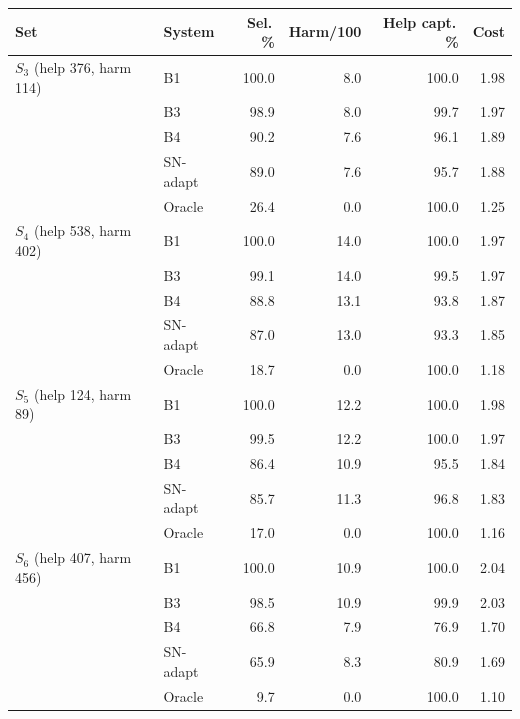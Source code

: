 \begin{tabular}{@{}llrrrr@{}}\toprule
Set & System & Sel.\,\% & Harm/100 & Help capt.\,\% & Cost\\\midrule
$S_3$ \scriptsize(help 376, harm 114) & B1 & 100.0 & 8.0 & 100.0 & 1.98\\
 & B3 & 98.9 & 8.0 & 99.7 & 1.97\\
 & B4 & 90.2 & 7.6 & 96.1 & 1.89\\
 & SN-adapt & 89.0 & 7.6 & 95.7 & 1.88\\
 & Oracle & 26.4 & 0.0 & 100.0 & 1.25\\
\midrule
$S_4$ \scriptsize(help 538, harm 402) & B1 & 100.0 & 14.0 & 100.0 & 1.97\\
 & B3 & 99.1 & 14.0 & 99.5 & 1.97\\
 & B4 & 88.8 & 13.1 & 93.8 & 1.87\\
 & SN-adapt & 87.0 & 13.0 & 93.3 & 1.85\\
 & Oracle & 18.7 & 0.0 & 100.0 & 1.18\\
\midrule
$S_5$ \scriptsize(help 124, harm 89) & B1 & 100.0 & 12.2 & 100.0 & 1.98\\
 & B3 & 99.5 & 12.2 & 100.0 & 1.97\\
 & B4 & 86.4 & 10.9 & 95.5 & 1.84\\
 & SN-adapt & 85.7 & 11.3 & 96.8 & 1.83\\
 & Oracle & 17.0 & 0.0 & 100.0 & 1.16\\
\midrule
$S_6$ \scriptsize(help 407, harm 456) & B1 & 100.0 & 10.9 & 100.0 & 2.04\\
 & B3 & 98.5 & 10.9 & 99.9 & 2.03\\
 & B4 & 66.8 & 7.9 & 76.9 & 1.70\\
 & SN-adapt & 65.9 & 8.3 & 80.9 & 1.69\\
 & Oracle & 9.7 & 0.0 & 100.0 & 1.10\\

\bottomrule\end{tabular}
